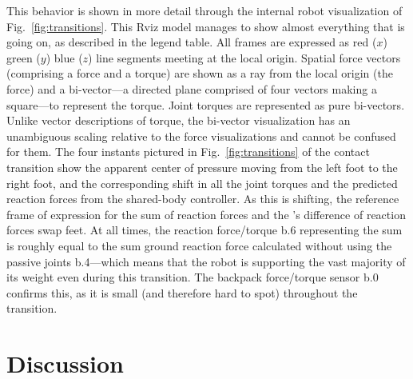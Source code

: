  This behavior is shown in more detail through the internal robot visualization of Fig.~\ref{fig:transitions}.
 This Rviz model manages to show almost everything that is going on, as described in the legend table.
 All frames are expressed as red ($x$) green ($y$) blue ($z$) line segments meeting at the local origin.
 Spatial force vectors (comprising a force and a torque) are shown as a ray from the local origin (the force) and a bi-vector---a directed plane comprised of four vectors making a square---to represent the torque. Joint torques are represented as pure bi-vectors.
 Unlike vector descriptions of torque, the bi-vector visualization has an unambiguous scaling relative to the force visualizations and cannot be confused for them.
 The four instants pictured in Fig.~\ref{fig:transitions} of the contact transition show the apparent center of pressure moving from the left foot to the right foot, and the corresponding shift in all the joint torques and the predicted reaction forces from the shared-body controller.
 As this is shifting, the reference frame of expression for the sum of reaction forces and the 's difference of reaction forces swap feet.
 At all times, the reaction force/torque b.6 representing the sum is roughly equal to the sum ground reaction force calculated without using the passive joints b.4---which means that the robot is supporting the vast majority of its weight even during this transition.
 The backpack force/torque sensor b.0 confirms this, as it is small (and therefore hard to spot) throughout the transition.












\section{Discussion}\label{sec:disc}



